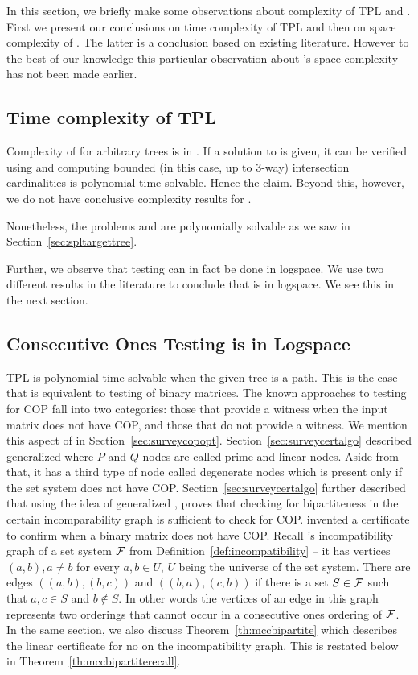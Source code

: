 In this section, we briefly make some observations about complexity of
TPL and \COP. First we present our conclusions on time complexity of
TPL and then on space complexity of \COP. The latter is a conclusion
based on existing literature. However to the best of our knowledge
this particular observation about \COP's space complexity has not been
made earlier.

\subsection{Time complexity of TPL}
\label{sec:tpltime}
Complexity of \CFTPL for arbitrary trees is in \np. If a solution to
\CFTPL is given, it can be verified using \ICPPL and computing bounded
(in this case, up to 3-way) intersection cardinalities is polynomial
time solvable. Hence the claim. Beyond this, however, we do not have
conclusive complexity results for \CFTPL. 

Nonetheless, the problems \CFTPLINT and \CFTPLKTREE are polynomially
solvable as we saw in Section~\ref{sec:spltargettree}.

Further, we observe that \COP testing can in fact be done in
logspace. We use two different results in the literature \cite{kklv10,
  mcc04} to conclude that \COP is in logspace. We see this in the next
section.


\subsection{Consecutive Ones Testing is in Logspace}
\label{sec:cotlogspace}
TPL is polynomial time solvable when the given tree is a path. This is
the case that is equivalent to \COP testing of binary matrices.
The known approaches to testing for COP fall into two categories:
those that provide a witness when the input matrix does not have COP,
and those that do not provide a witness.  We mention this aspect of
\COT in Section~\ref{sec:surveycopopt}.
Section~\ref{sec:surveycertalgo} described generalized \PQtree where
$P$ and $Q$ nodes are called prime and linear nodes. Aside from that,
it has a third type of node called degenerate nodes which is present
only if the set system does not have COP.
Section~\ref{sec:surveycertalgo} further described that using the idea
of generalized \PQtree, \cite{mcc04} proves that checking for
bipartiteness in the certain incomparability graph is sufficient to
check for COP.  \cite{mcc04} invented a certificate to confirm when a
binary matrix does not have COP.  Recall \cite{mcc04}'s
incompatibility graph of a set system ${\cal F}$ from
Definition~\ref{def:incompatibility} -- it has vertices $(a,b), a \ne
b$ for every $a, b \in U$, $U$ being the universe of the set
system. There are edges $((a,b),(b,c))$ and $((b,a),(c,b))$ if there
is a set $S \in {\cal F}$ such that $a, c \in S$ and $b \notin S$. In other
words the vertices of an edge in this graph represents two orderings
that cannot occur in a consecutive ones ordering of ${\cal F}$.  In the
same section, we also discuss Theorem~\ref{th:mccbipartite} which
describes the linear certificate for no \COP on the incompatibility
graph.  This is restated below in Theorem~\ref{th:mccbipartiterecall}.


